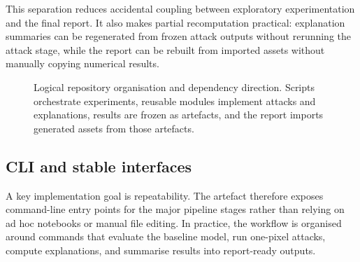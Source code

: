This separation reduces accidental coupling between exploratory experimentation and the final
report. It also makes partial recomputation practical: explanation summaries can be regenerated
from frozen attack outputs without rerunning the attack stage, while the report can be rebuilt
from imported assets without manually copying numerical results.

\begin{figure}[tbp]
\centering
{}
\caption{Logical repository organisation and dependency direction. Scripts orchestrate
experiments, reusable modules implement attacks and explanations, results are frozen as
artefacts, and the report imports generated assets from those artefacts.}
\label{fig:impl_repo}
\end{figure}

\subsection{CLI and stable interfaces}
A key implementation goal is repeatability. The artefact therefore exposes command-line entry
points for the major pipeline stages rather than relying on ad hoc notebooks or manual file
editing. In practice, the workflow is organised around commands that evaluate the baseline
model, run one-pixel attacks, compute explanations, and summarise results into report-ready
outputs.

